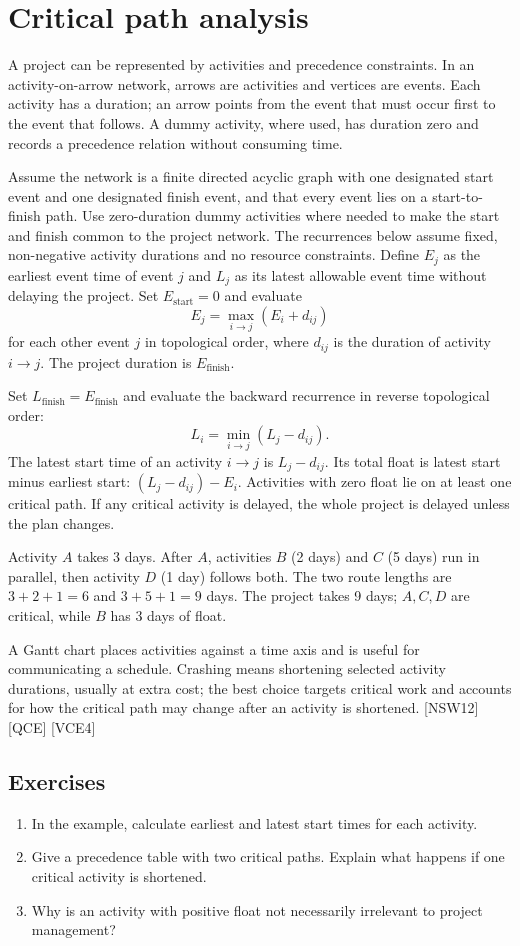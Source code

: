 \chapter{Critical path analysis}
A project can be represented by activities and precedence constraints. In an activity-on-arrow network, arrows are activities and vertices are events. Each activity has a duration; an arrow points from the event that must occur first to the event that follows. A dummy activity, where used, has duration zero and records a precedence relation without consuming time.

Assume the network is a finite directed acyclic graph with one designated start event and one designated finish event, and that every event lies on a start-to-finish path. Use zero-duration dummy activities where needed to make the start and finish common to the project network. The recurrences below assume fixed, non-negative activity durations and no resource constraints. Define $E_j$ as the earliest event time of event $j$ and $L_j$ as its latest allowable event time without delaying the project. Set $E_{\text{start}}=0$ and evaluate
\[
E_j=\max_{i\to j}(E_i+d_{ij})
\]
for each other event $j$ in topological order, where $d_{ij}$ is the duration of activity $i\to j$. The project duration is $E_{\text{finish}}$.

Set $L_{\text{finish}}=E_{\text{finish}}$ and evaluate the backward recurrence in reverse topological order:
\[
L_i=\min_{i\to j}(L_j-d_{ij}).
\]
The latest start time of an activity $i\to j$ is $L_j-d_{ij}$. Its total float is latest start minus earliest start: $(L_j-d_{ij})-E_i$. Activities with zero float lie on at least one critical path. If any critical activity is delayed, the whole project is delayed unless the plan changes.

\begin{example}
Activity $A$ takes 3 days. After $A$, activities $B$ (2 days) and $C$ (5 days) run in parallel, then activity $D$ (1 day) follows both. The two route lengths are $3+2+1=6$ and $3+5+1=9$ days. The project takes 9 days; $A,C,D$ are critical, while $B$ has 3 days of float.
\end{example}

A Gantt chart places activities against a time axis and is useful for communicating a schedule. Crashing means shortening selected activity durations, usually at extra cost; the best choice targets critical work and accounts for how the critical path may change after an activity is shortened. [NSW12] [QCE] [VCE4]

\section*{Exercises}
\begin{enumerate}
\item In the example, calculate earliest and latest start times for each activity.
\item Give a precedence table with two critical paths. Explain what happens if one critical activity is shortened.
\item Why is an activity with positive float not necessarily irrelevant to project management?
\end{enumerate}
